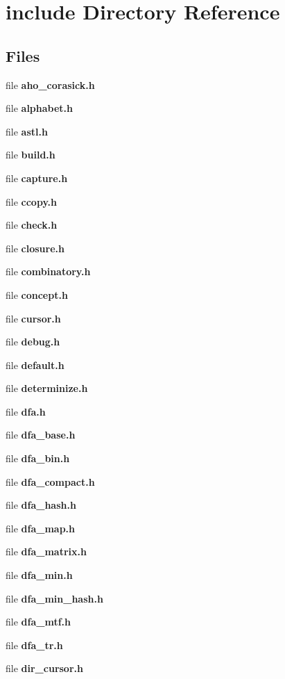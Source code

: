 \section{include Directory Reference}
\label{dir_d44c64559bbebec7f509842c48db8b23}
\subsection*{Files}
\begin{DoxyCompactItemize}
\item 
file {\bfseries aho\+\_\+corasick.\+h}
\item 
file {\bfseries alphabet.\+h}
\item 
file {\bfseries astl.\+h}
\item 
file {\bfseries build.\+h}
\item 
file {\bfseries capture.\+h}
\item 
file {\bf ccopy.\+h}
\item 
file {\bfseries check.\+h}
\item 
file {\bfseries closure.\+h}
\item 
file {\bfseries combinatory.\+h}
\item 
file {\bfseries concept.\+h}
\item 
file {\bf cursor.\+h}
\item 
file {\bfseries debug.\+h}
\item 
file {\bfseries default.\+h}
\item 
file {\bfseries determinize.\+h}
\item 
file {\bfseries dfa.\+h}
\item 
file {\bfseries dfa\+\_\+base.\+h}
\item 
file {\bfseries dfa\+\_\+bin.\+h}
\item 
file {\bfseries dfa\+\_\+compact.\+h}
\item 
file {\bfseries dfa\+\_\+hash.\+h}
\item 
file {\bfseries dfa\+\_\+map.\+h}
\item 
file {\bfseries dfa\+\_\+matrix.\+h}
\item 
file {\bfseries dfa\+\_\+min.\+h}
\item 
file {\bfseries dfa\+\_\+min\+\_\+hash.\+h}
\item 
file {\bfseries dfa\+\_\+mtf.\+h}
\item 
file {\bfseries dfa\+\_\+tr.\+h}
\item 
file {\bfseries dir\+\_\+cursor.\+h}
\item 

\end{DoxyCompactItemize}
